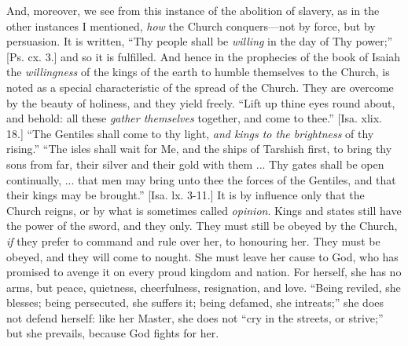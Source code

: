 And, moreover, we see from this instance of the abolition of
slavery, as in the other instances I mentioned, \emph{how} the Church
conquers—not by force, but by persuasion. It is written, ``Thy
people shall be \emph{willing} in the day of Thy power;'' [Ps. cx.
3.] and so it is fulfilled. And hence in the prophecies of the book of
Isaiah the \emph{willingness} of the kings of the earth to humble
themselves to the Church, is noted as a special characteristic of the
spread of the Church. They are overcome by the beauty of holiness, and
they yield freely. ``Lift up thine eyes round about, and behold:
all these \emph{gather themselves} together, and come to thee.'' [Isa.
xlix. 18.] ``The Gentiles shall come to thy light, \emph{and kings to
the brightness} of thy rising.'' ``The isles shall wait for
Me, and the ships of Tarshish first, to bring thy sons from far, their
silver and their gold with them ... Thy gates shall be open
continually, ... that men may bring unto thee the forces of the
Gentiles, and that their kings may be brought.'' [Isa. lx. 3-11.]
It is by influence only that the Church reigns, or by what is
sometimes called \emph{opinion}. Kings and states still have the power
of the sword, and they only. They must still be obeyed by the Church, \emph{if}
they prefer to command and rule over her, to honouring her. They must
be obeyed, and they will come to nought. She must leave her cause to
God, who has promised to avenge it on every proud kingdom and nation.
For herself, she has no arms, but peace, quietness, cheerfulness,
resignation, and love. ``Being reviled, she blesses; being
persecuted, she suffers it; being defamed, she intreats;'' she
does not defend herself: like her Master, she does not ``cry in
the streets, or strive;'' but she prevails, because God fights for
her.

